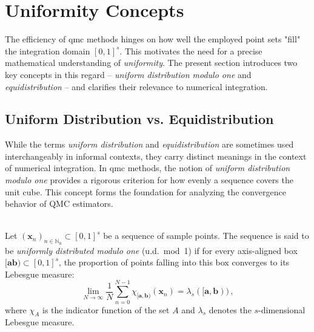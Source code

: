 \section{Uniformity Concepts}
\label{sec:uniformity-concepts}

The efficiency of \ac{qmc} methods hinges on how well the employed point sets
"fill" the integration domain $[0,1]^s$. This motivates the need for a precise
mathematical understanding of \emph{uniformity}. The present section introduces
two key concepts in this regard -- \emph{uniform distribution modulo one} and
\emph{equidistribution} -- and clarifies their relevance to numerical
integration.

\subsection{Uniform Distribution vs. Equidistribution}

While the terms \emph{uniform distribution} and \emph{equidistribution} are
sometimes used interchangeably in informal contexts, they carry distinct
meanings in the context of numerical integration. In \ac{qmc} methods, the
notion of \emph{uniform distribution modulo one} provides a rigorous criterion
for how evenly a sequence covers the unit cube. This concept forms the
foundation for analyzing the convergence behavior of QMC estimators.

\begin{definition} \ \\
Let $(\boldsymbol{x}_n)_{n \in \mathbb{N}_0} \subset [0,1]^s$ be a sequence of
sample points. The sequence is said to be \emph{uniformly distributed modulo
one} (u.d.\ mod~1) if for every axis-aligned box $[\boldsymbol{a}
\boldsymbol{b}) \subset [0,1]^s$, the proportion of points falling into this box
converges to its Lebesgue measure:
\begin{equation*}
    \lim_{N \to \infty} \frac{1}{N} \sum_{n=0}^{N-1} \chi_{[\boldsymbol{a}, \boldsymbol{b})}(\boldsymbol{x}_n)
    = \lambda_s([\boldsymbol{a}, \boldsymbol{b})) \,,
\end{equation*}
where $\chi_A$ is the indicator function of the set $A$ and $\lambda_s$ denotes
the $s$-dimensional Lebesgue measure.
\end{definition}

